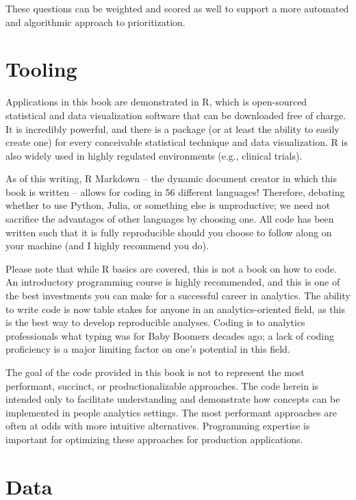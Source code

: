 \documentclass[
]{book}
\begin{document}
These questions can be weighted and scored as well to support a more automated and algorithmic approach to prioritization.

\hypertarget{tooling}{%
\section{Tooling}\label{tooling}}

Applications in this book are demonstrated in R, which is open-sourced statistical and data visualization software that can be downloaded free of charge. It is incredibly powerful, and there is a package (or at least the ability to easily create one) for every conceivable statistical technique and data visualization. R is also widely used in highly regulated environments (e.g., clinical trials).

As of this writing, R Markdown -- the dynamic document creator in which this book is written -- allows for coding in 56 different languages! Therefore, debating whether to use Python, Julia, or something else is unproductive; we need not sacrifice the advantages of other languages by choosing one. All code has been written such that it is fully reproducible should you choose to follow along on your machine (and I highly recommend you do).

Please note that while R basics are covered, this is not a book on how to code. An introductory programming course is highly recommended, and this is one of the best investments you can make for a successful career in analytics. The ability to write code is now table stakes for anyone in an analytics-oriented field, as this is the best way to develop reproducible analyses. Coding is to analytics professionals what typing was for Baby Boomers decades ago; a lack of coding proficiency is a major limiting factor on one's potential in this field.

The goal of the code provided in this book is not to represent the most performant, succinct, or productionalizable approaches. The code herein is intended only to facilitate understanding and demonstrate how concepts can be implemented in people analytics settings. The most performant approaches are often at odds with more intuitive alternatives. Programming expertise is important for optimizing these approaches for production applications.

\hypertarget{data}{%
\section{Data}\label{data}}
\end{document}
